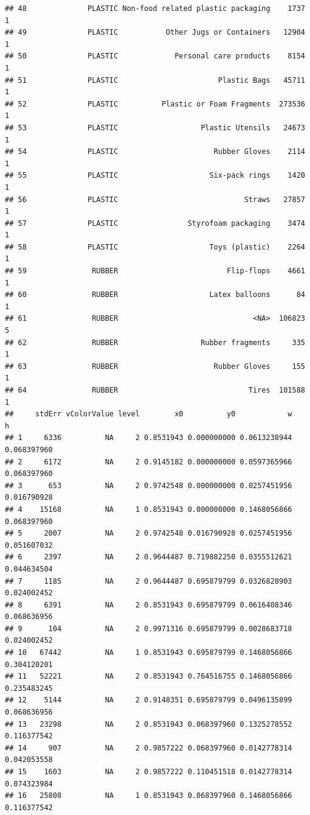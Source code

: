 \documentclass[10pt]{article}\usepackage[]{graphicx}\usepackage[]{color}
\makeatletter
\newenvironment{kframe}{%
 \def\at@end@of@kframe{}%
 \ifinner\ifhmode%
  \def\at@end@of@kframe{\end{minipage}}%
  \begin{minipage}{\columnwidth}%
 \fi\fi%
 \def\FrameCommand##1{\hskip\@totalleftmargin \hskip-\fboxsep
 \colorbox{shadecolor}{##1}\hskip-\fboxsep
     \hskip-\linewidth \hskip-\@totalleftmargin \hskip\columnwidth}%
 \MakeFramed {\advance\hsize-\width
   \@totalleftmargin\z@ \linewidth\hsize
   \@setminipage}}%
 {\par\unskip\endMakeFramed%
 \at@end@of@kframe}
\newenvironment{knitrout}{}{} %
\makeatother
\begin{document}
\begin{itemize}
\begin{knitrout}
\begin{kframe}
\begin{verbatim}
## 48              PLASTIC Non-food related plastic packaging    1737      1
## 49              PLASTIC           Other Jugs or Containers   12904      1
## 50              PLASTIC             Personal care products    8154      1
## 51              PLASTIC                       Plastic Bags   45711      1
## 52              PLASTIC          Plastic or Foam Fragments  273536      1
## 53              PLASTIC                   Plastic Utensils   24673      1
## 54              PLASTIC                      Rubber Gloves    2114      1
## 55              PLASTIC                     Six-pack rings    1420      1
## 56              PLASTIC                             Straws   27857      1
## 57              PLASTIC                Styrofoam packaging    3474      1
## 58              PLASTIC                     Toys (plastic)    2264      1
## 59               RUBBER                         Flip-flops    4661      1
## 60               RUBBER                     Latex balloons      84      1
## 61               RUBBER                               <NA>  106823      5
## 62               RUBBER                   Rubber fragments     335      1
## 63               RUBBER                      Rubber Gloves     155      1
## 64               RUBBER                              Tires  101588      1
##     stdErr vColorValue level        x0          y0            w           h
## 1     6336          NA     2 0.8531943 0.000000000 0.0613238944 0.068397960
## 2     6172          NA     2 0.9145182 0.000000000 0.0597365966 0.068397960
## 3      653          NA     2 0.9742548 0.000000000 0.0257451956 0.016790928
## 4    15168          NA     1 0.8531943 0.000000000 0.1468056866 0.068397960
## 5     2007          NA     2 0.9742548 0.016790928 0.0257451956 0.051607032
## 6     2397          NA     2 0.9644487 0.719882250 0.0355512621 0.044634504
## 7     1185          NA     2 0.9644487 0.695879799 0.0326828903 0.024002452
## 8     6391          NA     2 0.8531943 0.695879799 0.0616408346 0.068636956
## 9      104          NA     2 0.9971316 0.695879799 0.0028683718 0.024002452
## 10   67442          NA     1 0.8531943 0.695879799 0.1468056866 0.304120201
## 11   52221          NA     2 0.8531943 0.764516755 0.1468056866 0.235483245
## 12    5144          NA     2 0.9148351 0.695879799 0.0496135899 0.068636956
## 13   23298          NA     2 0.8531943 0.068397960 0.1325278552 0.116377542
## 14     907          NA     2 0.9857222 0.068397960 0.0142778314 0.042053558
## 15    1603          NA     2 0.9857222 0.110451518 0.0142778314 0.074323984
## 16   25808          NA     1 0.8531943 0.068397960 0.1468056866 0.116377542

\end{verbatim}
\end{kframe}
\end{knitrout}
\end{itemize}
\end{document}
